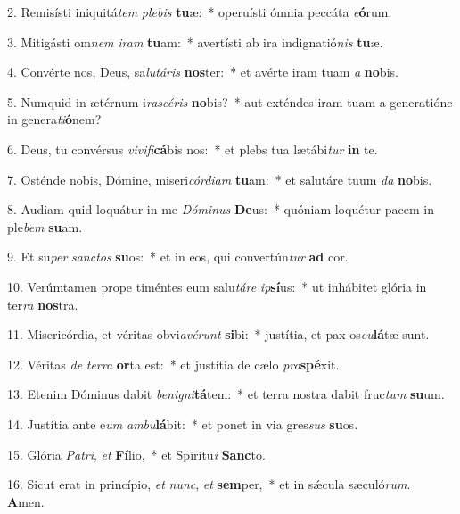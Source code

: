 2. Remisísti iniquitá\textit{tem} \textit{ple}\textit{bis} \textbf{tu}æ:~*  operuísti ómnia peccáta \textit{e}\textbf{ó}rum.\

3. Mitigásti om\textit{nem} \textit{i}\textit{ram} \textbf{tu}am:~*  avertísti ab ira indignatió\textit{nis} \textbf{tu}æ.\

4. Convérte nos, Deus, sa\textit{lu}\textit{tá}\textit{ris} \textbf{nos}ter:~*  et avérte iram tuam \textit{a} \textbf{no}bis.\

5. Numquid in ætérnum i\textit{ra}\textit{scé}\textit{ris} \textbf{no}bis?~*  aut exténdes iram tuam a generatióne in genera\textit{ti}\textbf{ó}nem?\

6. Deus, tu convérsus \textit{vi}\textit{vi}\textit{fi}\textbf{cá}bis nos:~*  et plebs tua lætábi\textit{tur} \textbf{in} te.\

7. Osténde nobis, Dómine, miseri\textit{cór}\textit{di}\textit{am} \textbf{tu}am:~*  et salutáre tuum \textit{da} \textbf{no}bis.\

8. Audiam quid loquátur in me \textit{Dó}\textit{mi}\textit{nus} \textbf{De}us:~*  quóniam loquétur pacem in ple\textit{bem} \textbf{su}am.\

9. Et su\textit{per} \textit{sanc}\textit{tos} \textbf{su}os:~*  et in eos, qui convertún\textit{tur} \textbf{ad} cor.\

10. Verúmtamen prope timéntes eum salu\textit{tá}\textit{re} \textit{ip}\textbf{sí}us:~*  ut inhábitet glória in ter\textit{ra} \textbf{nos}tra.\

11. Misericórdia, et véritas obvi\textit{a}\textit{vé}\textit{runt} \textbf{si}bi:~*  justítia, et pax os\textit{cu}\textbf{lá}tæ sunt.\

12. Véritas \textit{de} \textit{ter}\textit{ra} \textbf{or}ta est:~*  et justítia de cælo \textit{pro}\textbf{spé}xit.\

13. Etenim Dóminus dabit \textit{be}\textit{ni}\textit{gni}\textbf{tá}tem:~*  et terra nostra dabit fruc\textit{tum} \textbf{su}um.\

14. Justítia ante e\textit{um} \textit{am}\textit{bu}\textbf{lá}bit:~*  et ponet in via gres\textit{sus} \textbf{su}os.\

15. Glória \textit{Pa}\textit{tri}, \textit{et} \textbf{Fí}lio,~*  et Spirítu\textit{i} \textbf{Sanc}to.\

16. Sicut erat in princípio, \textit{et} \textit{nunc}, \textit{et} \textbf{sem}per,~*  et in sǽcula sæculó\textit{rum}. \textbf{A}men.\

